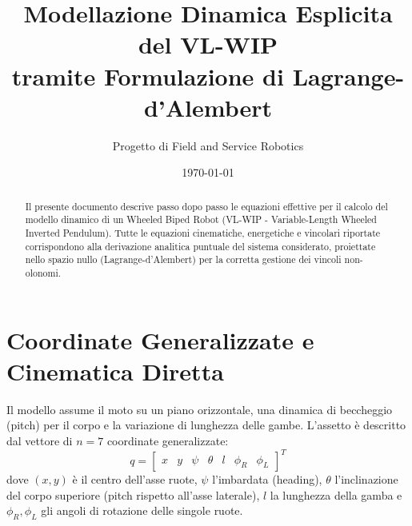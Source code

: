 \documentclass[11pt,a4paper]{article}
\title{\textbf{Modellazione Dinamica Esplicita del VL-WIP\\tramite Formulazione di Lagrange-d'Alembert}}
\author{Progetto di Field and Service Robotics}
\date{\today}
\begin{document}
\maketitle

\begin{abstract}
Il presente documento descrive passo dopo passo le equazioni effettive per il calcolo del modello dinamico di un Wheeled Biped Robot (VL-WIP - Variable-Length Wheeled Inverted Pendulum). Tutte le equazioni cinematiche, energetiche e vincolari riportate corrispondono alla derivazione analitica puntuale del sistema considerato, proiettate nello spazio nullo (Lagrange-d'Alembert) per la corretta gestione dei vincoli non-olonomi.
\end{abstract}

\section{Coordinate Generalizzate e Cinematica Diretta}

Il modello assume il moto su un piano orizzontale, una dinamica di beccheggio (pitch) per il corpo e la variazione di lunghezza delle gambe. L'assetto è descritto dal vettore di $n = 7$ coordinate generalizzate:
\begin{equation}
    q = \begin{bmatrix} x & y & \psi & \theta & l & \phi_R & \phi_L \end{bmatrix}^T
\end{equation}
dove $(x,y)$ è il centro dell'asse ruote, $\psi$ l'imbardata (heading), $\theta$ l'inclinazione del corpo superiore (pitch rispetto all'asse laterale), $l$ la lunghezza della gamba e $\phi_R, \phi_L$ gli angoli di rotazione delle singole ruote.
\end{document}

